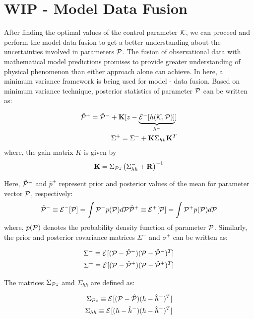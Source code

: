 \documentclass{article}         %
\theoremstyle{definition}
\theoremstyle{remark}
\begin{document}
\section{WIP - Model Data Fusion}\label{da}
After finding the optimal values of the control parameter $\kk$, we can proceed and perform the model-data fusion to get a better understanding about the uncertainties involved in parameters $\p$.
The fusion of observational data with mathematical model predictions promises to provide greater understanding of physical phenomenon than either approach alone can achieve. In here, a minimum variance framework is being used for model - data fusion. Based on minimum variance technique, posterior statistics of parameter $\p$ can be written as:

\begin{eqnarray}
\hat{\p}^+=\hat{\p}^-+\K[z-\underbrace{\Ex{h(\kk,\p)}{-}}_{h^-}]\label{minvarmean}\\
\Sigma^+=\Sigma^-+\K\Sigma_{hh}\K^T\label{minvarvar}
\end{eqnarray}
where, %
the gain matrix $K$ is given by
\begin{eqnarray}\label{kgain}
\K=\Sigma_{\p z}\left(\Sigma_{hh}^-+\R\right)^{-1}
\end{eqnarray}

Here, $\hat{\p}^-$ and $\hat{p}^+$ represent prior and posterior values of the mean for parameter vector $\p$, respectively:
\begin{eqnarray}
\hat{\p}^-\equiv \Ex{\p}{-}=\int \p^- p(\p)d\p \label{Pprior}
\hat{\p}^+\equiv \Ex{\p}{+}=\int \p^+ p(\p)d\p \label{Pposterior}
\end{eqnarray}
where, $p(\p)$ denotes the probability density function of parameter $\p$. Similarly, the prior and posterior covariance matrices $\Sigma^{-}$ and $\sigma^+$ can be written as:

\begin{eqnarray}
\Sigma^-\equiv\Ex{(\p-\hat{\p}^-)(\p-\hat{\p}^-)^T}{}\\
\Sigma^+\equiv\Ex{(\p-\hat{\p}^+)(\p-\hat{\p}^+)^T}{}
\end{eqnarray}

The matrices $\Sigma_{\p z}$ amd $\Sigma_{hh}$ are defined as:

\begin{eqnarray}
\Sigma_{\p z} \equiv\Ex{(\p-\hat{\p})(h-\hat{h}^-)^T}{}\\
\Sigma_{hh} \equiv\Ex{(h-\hat{h}^-)(h-\hat{h}^-)^T}{}
\end{eqnarray}
\end{document}
